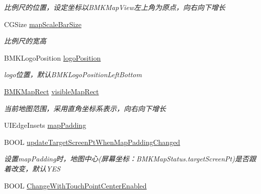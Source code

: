 \begin{DoxyCompactItemize}
\begin{DoxyCompactList}\small\item\em 比例尺的位置，设定坐标以\+B\+M\+K\+Map\+View左上角为原点，向右向下增长 \end{DoxyCompactList}\item 
\hypertarget{interface_b_m_k_map_view_a07d445e2f05ffb22b1adf8171c73e048}{}C\+G\+Size \hyperlink{interface_b_m_k_map_view_a07d445e2f05ffb22b1adf8171c73e048}{map\+Scale\+Bar\+Size}\label{interface_b_m_k_map_view_a07d445e2f05ffb22b1adf8171c73e048}

\begin{DoxyCompactList}\small\item\em 比例尺的宽高 \end{DoxyCompactList}\item 
\hypertarget{interface_b_m_k_map_view_a38d66b04c78c87a95bf16b6a94858438}{}B\+M\+K\+Logo\+Position \hyperlink{interface_b_m_k_map_view_a38d66b04c78c87a95bf16b6a94858438}{logo\+Position}\label{interface_b_m_k_map_view_a38d66b04c78c87a95bf16b6a94858438}

\begin{DoxyCompactList}\small\item\em logo位置，默认\+B\+M\+K\+Logo\+Position\+Left\+Bottom \end{DoxyCompactList}\item 
\hypertarget{interface_b_m_k_map_view_a35576ab39592ef50d1190c2b672c0923}{}\hyperlink{struct_b_m_k_map_rect}{B\+M\+K\+Map\+Rect} \hyperlink{interface_b_m_k_map_view_a35576ab39592ef50d1190c2b672c0923}{visible\+Map\+Rect}\label{interface_b_m_k_map_view_a35576ab39592ef50d1190c2b672c0923}

\begin{DoxyCompactList}\small\item\em 当前地图范围，采用直角坐标系表示，向右向下增长 \end{DoxyCompactList}\item 
U\+I\+Edge\+Insets \hyperlink{interface_b_m_k_map_view_a04e5562fe721155f4412a7fdd9ab7a80}{map\+Padding}
\item 
\hypertarget{interface_b_m_k_map_view_ad1f485188a02891962391be67c71c434}{}B\+O\+O\+L \hyperlink{interface_b_m_k_map_view_ad1f485188a02891962391be67c71c434}{update\+Target\+Screen\+Pt\+When\+Map\+Padding\+Changed}\label{interface_b_m_k_map_view_ad1f485188a02891962391be67c71c434}

\begin{DoxyCompactList}\small\item\em 设置map\+Padding时，地图中心(屏幕坐标：\+B\+M\+K\+Map\+Status.\+target\+Screen\+Pt)是否跟着改变，默认\+Y\+E\+S \end{DoxyCompactList}\item 
\hypertarget{interface_b_m_k_map_view_aa1868ea167edc68fe4b15ad982968ade}{}B\+O\+O\+L \hyperlink{interface_b_m_k_map_view_aa1868ea167edc68fe4b15ad982968ade}{Change\+With\+Touch\+Point\+Center\+Enabled}\label{interface_b_m_k_map_view_aa1868ea167edc68fe4b15ad982968ade}


\end{DoxyCompactItemize}
